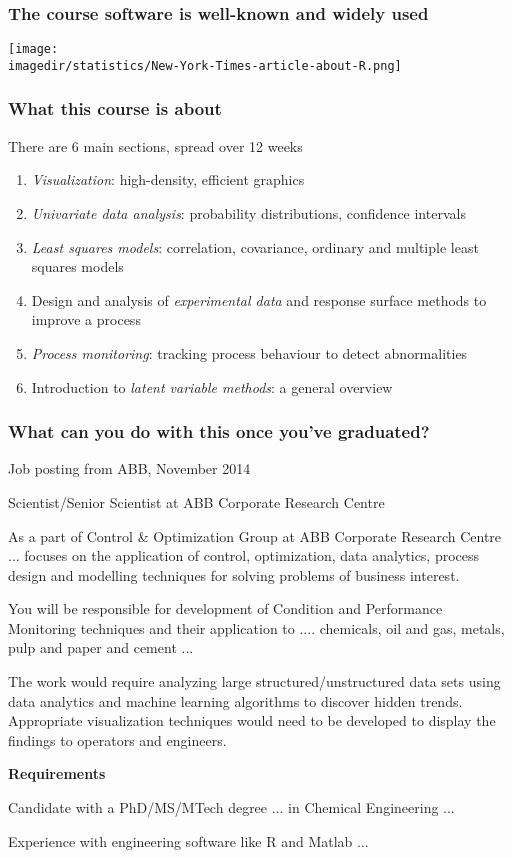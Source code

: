 \begin{frame}\frametitle{The course software is well-known and widely used}
	\texttt{[image: \\imagedir/statistics/New-York-Times-article-about-R.png]}
\end{frame}

\begin{frame}\frametitle{What this course is about}
	There are 6 main sections, spread over 12 weeks
	\begin{enumerate}
		\item	\emph{Visualization}: high-density, efficient graphics
		\item	\emph{Univariate data analysis}: probability distributions, confidence intervals
		\item	\emph{Least squares models}: correlation, covariance, ordinary and multiple least squares models
		\item	Design and analysis of \emph{experimental data} and response surface methods to improve a process
		\item	\emph{Process monitoring}: tracking process behaviour to detect abnormalities
		\item	Introduction to \emph{latent variable methods}: a general overview
	\end{enumerate}
\end{frame}

\begin{frame}\frametitle{What can you do with this once you've graduated?}
	
	{\footnotesize Job posting from ABB, November 2014}
	\begin{exampleblock}{Scientist/Senior Scientist at ABB Corporate Research Centre}
		
		
		\small 
		
		As a part of
		Control \& Optimization Group at ABB Corporate Research Centre ... focuses on the application of control,
		optimization, data analytics, process design and modelling techniques for
		solving problems of business interest.

		\vspace{10pt}
		You will be responsible for development of
		Condition and Performance Monitoring techniques and their application to  .... chemicals, oil and gas, metals, pulp and paper and
		cement ... 
		
		\vspace{10pt}
		The work would require
		analyzing large structured/unstructured data sets using data analytics and
		machine learning algorithms to discover hidden trends.  Appropriate
		visualization techniques would need to be developed to display the
		findings to operators and engineers.

		\textbf{Requirements}

		Candidate with a PhD/MS/MTech degree ... in Chemical Engineering ...
		
		
		Experience with engineering software like R and Matlab  ...
	\end{exampleblock}
	
\end{frame}


